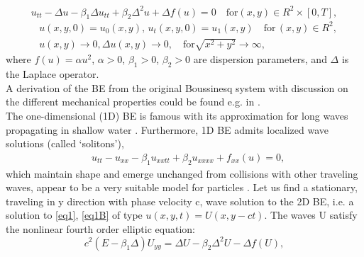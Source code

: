 \documentclass[12pt]{article}
\theoremstyle{theorem}
\theoremstyle{defi}
\begin{document}
\begin{equation}
u_{tt} - \Delta u -\beta_1  \Delta u_{tt} +\beta_2 \Delta ^2 u + \Delta f(u)=0 \quad \text{for} (x,y) \in R^2 \times [0,T] ,\label{eq1}
\end{equation}
\begin{equation}\label{eq1B}
\begin{split}
&u(x,y,0)=u_0(x,y), \, u_t(x,y,0)=u_1(x,y)   \quad\text{for} \, (x,y) \in R^2, \\
&u(x,y) \rightarrow 0,  \Delta u(x,y) \rightarrow 0 ,  \quad \text{for}  \sqrt{x^2 + y^2} \rightarrow \infty, 
\end{split}
\end{equation}
where   $f(u)=\alpha u^2$,  $\alpha>0$, $\beta_1>0$, $\beta_2>0$  are dispersion parameters, and $\Delta$ is the Laplace operator. 
\\
A derivation of the BE from the original Boussinesq system with discussion on the different mechanical properties could be found e.g. in \cite{ref1}. 
\\
The one-dimensional (1D) BE is famous with its approximation for long waves propagating in shallow water \cite{ref2, ref3}. Furthermore, 1D BE admits localized wave solutions (called ‘solitons’), 
\begin{align}
&u_{tt} - u_{xx} -\beta_1  u_{xxtt} +\beta_2 u_{xxxx} + f_{xx}(u) =0, \label{eq2}
\end{align}
which maintain shape and emerge unchanged from collisions with other traveling waves, appear to be a very suitable model for particles \cite{ref4, ref5}.
Let us find a stationary, traveling in y direction with phase velocity c, wave solution to the 2D BE, i.e. a solution to \eqref{eq1}, \eqref{eq1B} of type $u(x,y,t)=U(x,y - ct)$. The waves U satisfy the nonlinear fourth order elliptic equation:
\begin{equation}
c^2 (E-\beta_1 \Delta) U_{yy} = \Delta U -\beta_2 \Delta^2 U - \Delta f(U), \label{eq3}
\end{equation}
\end{document}
